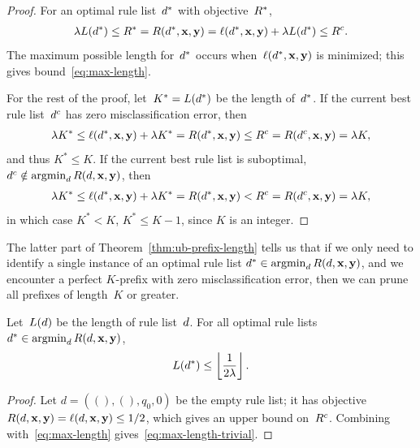 \begin{proof}
For an optimal rule list~$d^*$ with objective~$R^*$,
\begin{align}
\Reg L(\OptimalRL) \le \OptimalObj = \Obj(\OptimalRL, \x, \y)
= \Loss(\OptimalRL, \x, \y) + \Reg L(\OptimalRL)
\le \CurrentObj.
\end{align}
The maximum possible length for~$d^*$ occurs
when~$\ell(d^*, \mathbf{x}, \mathbf{y})$ is minimized;
this gives bound~\eqref{eq:max-length}.

For the rest of the proof,
let~${K^* = L(d^*)}$ be the length of~$d^*$.
%
If the current best rule list~$d^c$ has zero
misclassification error, then
\begin{align}
\Reg K^* \leq \Loss(\OptimalRL, \x, \y) + \Reg K^* = \Obj(\OptimalRL, \x, \y)
\le \CurrentObj = \Obj(\CurrentRL, \x, \y) = \Reg K,
\end{align}
and thus ${K^* \leq K}$.
%
If the current best rule list is suboptimal,
\ie ${d^c \notin \operatorname*{argmin}_{d} R({d}, \mathbf{x}, \mathbf{y})}$, then
%
\begin{align}
\Reg K^* \leq \Loss(\OptimalRL, \x, \y) + \Reg K^* = \Obj(\OptimalRL, \x, \y)
< \CurrentObj = \Obj(\CurrentRL, \x, \y) = \Reg K,
\end{align}
in which case ${K^* < K}$, \ie ${K^* \leq K-1}$, since $K$ is an integer.
\end{proof}

The latter part of Theorem~\ref{thm:ub-prefix-length} tells us that
if we only need to identify a single instance of an optimal rule list
${d^* \in \operatorname*{argmin}_{d} R({d}, \mathbf{x}, \mathbf{y})}$, and we encounter a perfect
$K$-prefix with zero misclassification error, then we can prune all
prefixes of length~$K$ or greater.

\begin{corollary}
\label{cor:ub-prefix-length}
Let~$L({d})$ be the length of rule list~${d}$.
%
For all optimal rule lists ${d^* \in \operatorname*{argmin}_{d} R({d}, \mathbf{x}, \mathbf{y})}$,
\begin{align}
L(\OptimalRL) \le \left\lfloor \frac{1}{2\Reg} \right\rfloor.
\label{eq:max-length-trivial}
\end{align}
\end{corollary}

\begin{proof}
Let ${d = ((), (), q_0, 0)}$ be the empty rule list;
it has objective ${R({d}, \mathbf{x}, \mathbf{y}) = \ell({d}, \mathbf{x}, \mathbf{y}) \le 1/2}$,
which gives an upper bound on~${R^c}$.
%
Combining with~\eqref{eq:max-length} gives~\eqref{eq:max-length-trivial}.
\end{proof}

